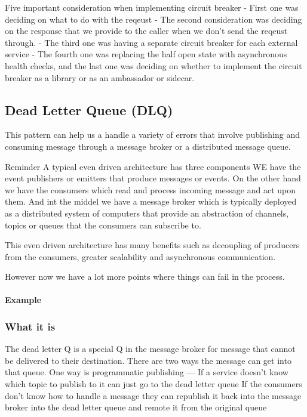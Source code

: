 \documentclass[a4paper, 11pt]{book}
\begin{document}
    Five important consideration when implementing circuit breaker
    - First one was deciding on what to do with the reqeust
    - The second consideration was deciding on the response that we provide to the caller when we don't send the reqeust through.
    - The third one was having a separate circuit breaker for each external service
    - The fourth one was replacing the half open state with asynchronous health checks, and the last one was deciding on whether to implement the circuit breaker as a library or as an ambassador or sidecar.

    \subsection{Dead Letter Queue (DLQ)}

    This pattern can help us a handle a variety of errors that involve publishing and consuming message through a message broker or a distributed message queue.

    Reminder
    A typical even driven architecture has three components
    WE have the event publishers or emitters that produce messages or events.
    On the other hand we have the consumers which read and process incoming message and act upon them.
    And int the middel we have a message broker which is typically deployed as a distributed system of computers that provide an abstraction of channels, topics or queues that the consumers can subscribe to.

    This even driven architecture has many benefits such as decoupling of producers from the consumers, greater scalability and asynchronous communication.

    However now we have a lot more points where things can fail in the process.

    \paragraph{Example}

    \subsubsection{What it is}
    The dead letter Q is a special Q in the message broker for message that cannot be delivered to their destination.
    There are two ways the message can get into that queue.
    One way is programmatic publishing
    --- If a service doesn't know which topic to publish to it can just go to the dead letter queue
    If the consumers don't know how to handle a message they can republish it back into the message broker into the dead letter queue and remote it from the original queue
\end{document}
